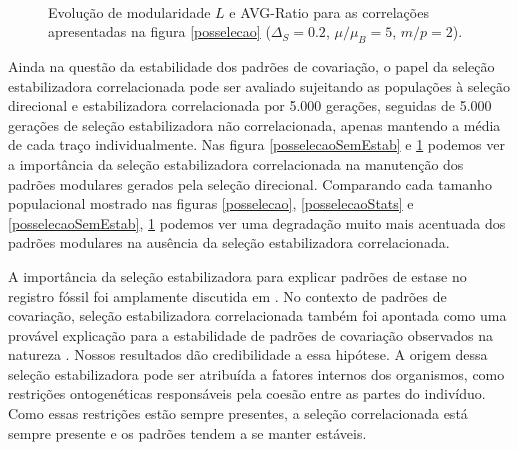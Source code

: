 \begin{figure}[htbp]
  \vspace{-18pt}
  \vspace{11pt}
  \\
  \caption{Evolução de modularidade $L$ e AVG-Ratio para as correlações
     apresentadas na figura \ref{posselecao} ($\Delta_S = 0.2$, $\mu/\mu_B=5$, $m/p=2$).}
  \label{posselecaoSemEstabStats}
\end{figure}


Ainda na questão da estabilidade dos padrões de covariação, o papel da
seleção estabilizadora correlacionada pode ser avaliado sujeitando as
populações à seleção direcional e estabilizadora correlacionada por 5.000
gerações, seguidas de 5.000 gerações de seleção estabilizadora não
correlacionada, apenas mantendo a média de cada traço individualmente.
Nas figura \ref{posselecaoSemEstab} e \ref{posselecaoSemEstabStats}
podemos ver a importância da seleção estabilizadora correlacionada na
manutenção dos padrões modulares gerados pela seleção direcional. 
Comparando cada tamanho populacional mostrado nas figuras
\ref{posselecao}, \ref{posselecaoStats} e \ref{posselecaoSemEstab},
\ref{posselecaoSemEstabStats} podemos ver uma degradação muito mais
acentuada dos padrões modulares na ausência da seleção
estabilizadora correlacionada. 

A importância da seleção estabilizadora para explicar padrões de estase
no registro fóssil foi amplamente discutida em \cite{Charlesworth1982a}.
No contexto de padrões de covariação, seleção estabilizadora
correlacionada também foi apontada como uma provável explicação para a
estabilidade de padrões de covariação observados na natureza
\citep{Cheverud1984, Marroig2001, Porto2008}. 
Nossos resultados dão credibilidade a essa hipótese. 
A origem dessa seleção estabilizadora pode ser atribuída a fatores
internos dos organismos, como restrições ontogenéticas responsáveis pela
coesão entre as partes do indivíduo. 
Como essas restrições estão sempre presentes, a seleção correlacionada
está sempre presente e os padrões tendem a se manter estáveis. 


